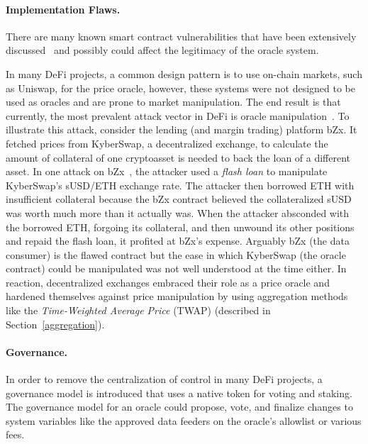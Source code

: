 
\paragraph{Implementation Flaws.}
There are many known smart contract vulnerabilities that have been extensively discussed~\cite{attacksonethereum,chen2020survey} and possibly could affect the legitimacy of the oracle system. 

In many DeFi projects, a common design pattern is to use on-chain markets, such as Uniswap, for the price oracle, however, these systems were not designed to be used as oracles and are prone to market manipulation. The end result is that currently, the most prevalent attack vector in DeFi is oracle manipulation~\cite{defiattacksreport}. To illustrate this attack, consider the lending (and margin trading) platform bZx. It fetched prices from KyberSwap, a decentralized exchange, to calculate the amount of collateral of one cryptoasset is needed to back the loan of a different asset. In one attack on bZx~\cite{bzxPeckShield}, the attacker used a \textit{flash loan} to manipulate KyberSwap's sUSD/ETH exchange rate. The attacker then borrowed ETH with insufficient collateral because the bZx contract believed the collateralized sUSD was worth much more than it actually was. When the attacker absconded with the borrowed ETH, forgoing its collateral, and then unwound its other positions and repaid the flash loan, it profited at bZx's expense. Arguably bZx (the data consumer) is the flawed contract but the ease in which KyberSwap (the oracle contract) could be manipulated was not well understood at the time either. In reaction, decentralized exchanges embraced their role as a price oracle and hardened themselves against price manipulation by using aggregation methods like the \textit{Time-Weighted Average Price} (TWAP) (described in Section~\ref{aggregation}). 

\paragraph{Governance.} %
In order to remove the centralization of control in many DeFi projects, a governance model is introduced that uses a native token for voting and staking. The governance model for an oracle could propose, vote, and finalize changes to system variables like the approved data feeders on the oracle's allowlist or various fees. 

